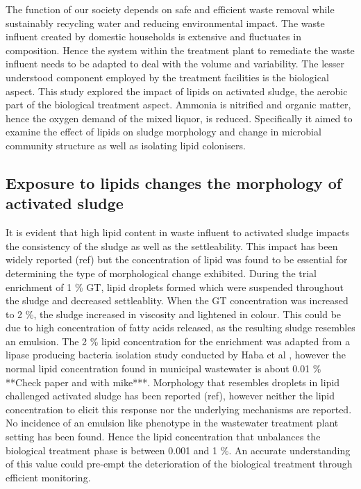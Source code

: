 \documentclass[11pt]{article}
\begin{document}
The function of our society depends on safe and efficient waste removal while sustainably recycling water and reducing environmental impact. The waste influent created by domestic households is extensive and fluctuates in composition. Hence the system within the treatment plant to remediate the waste influent needs to be adapted to deal with the volume and variability. The lesser understood component employed by the treatment facilities is the biological aspect. This study explored the impact of lipids on activated sludge, the aerobic part of the biological treatment aspect. Ammonia is nitrified and organic matter, hence the oxygen demand of the mixed liquor, is reduced. Specifically it aimed to examine the effect of lipids on sludge morphology and change in microbial community structure as well as isolating lipid colonisers.

\subsection{Exposure to lipids changes the morphology of activated sludge}
It is evident that high lipid content in waste influent to activated sludge impacts the consistency of the sludge as well as the settleability. This impact has been widely reported (ref) but the concentration of lipid was found to be essential for determining the type of morphological change exhibited. During the trial enrichment of 1 \% GT, lipid droplets formed which were suspended throughout the sludge and decreased settleablity. When the GT concentration was increased to 2 \%, the sludge increased in viscosity and lightened in colour. This could be due to high concentration of fatty acids released, as the resulting sludge resembles an emulsion. The 2 \% lipid concentration for the enrichment was adapted from a lipase producing bacteria isolation study conducted by Haba et al \cite{haba2000isolation}, however the normal lipid concentration found in municipal wastewater is about 0.01 \% {\LARGE ***Check paper and with mike***}. Morphology that resembles droplets in lipid challenged activated sludge has been reported (ref), however neither the lipid concentration to elicit this response nor the underlying mechanisms are reported. No incidence of an emulsion like phenotype in the wastewater treatment plant setting has been found. Hence the lipid concentration that unbalances the biological treatment phase is between 0.001 and 1 \%. An accurate understanding of this value could pre-empt the deterioration of the biological treatment through efficient monitoring.
\end{document}
